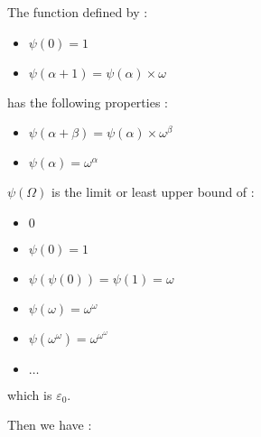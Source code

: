 \documentclass[10pt]{article}
\begin{document}
\bigskip

The function defined by :

\begin{itemize}
     \setlength{\itemsep}{1pt}
     \setlength{\parskip}{0pt}
     \setlength{\parsep}{0pt}
\item \( \psi(0) = 1 \)
\item \( \psi(\alpha+1) = \psi(\alpha) \times \omega \)
\end{itemize}

has the following properties :

\begin{itemize}
     \setlength{\itemsep}{1pt}
     \setlength{\parskip}{0pt}
     \setlength{\parsep}{0pt}
\item \( \psi(\alpha+\beta)=\psi(\alpha) \times \omega^\beta \)
\item \( \psi(\alpha) = \omega^\alpha \)
\end{itemize}

\( \psi(\Omega) \) is the limit or least upper bound of :

\begin{itemize}
     \setlength{\itemsep}{1pt}
     \setlength{\parskip}{0pt}
     \setlength{\parsep}{0pt}
\item \( 0 \)
\item \( \psi(0) = 1 \)
\item \( \psi(\psi(0)) = \psi(1) = \omega \)
\item \( \psi(\omega) = \omega^\omega \)
\item \( \psi(\omega^\omega) = \omega^{\omega^\omega} \)
\item \( \ldots \)
\end{itemize}

which is \( \varepsilon_0 \).

Then we have : 
\end{document}
